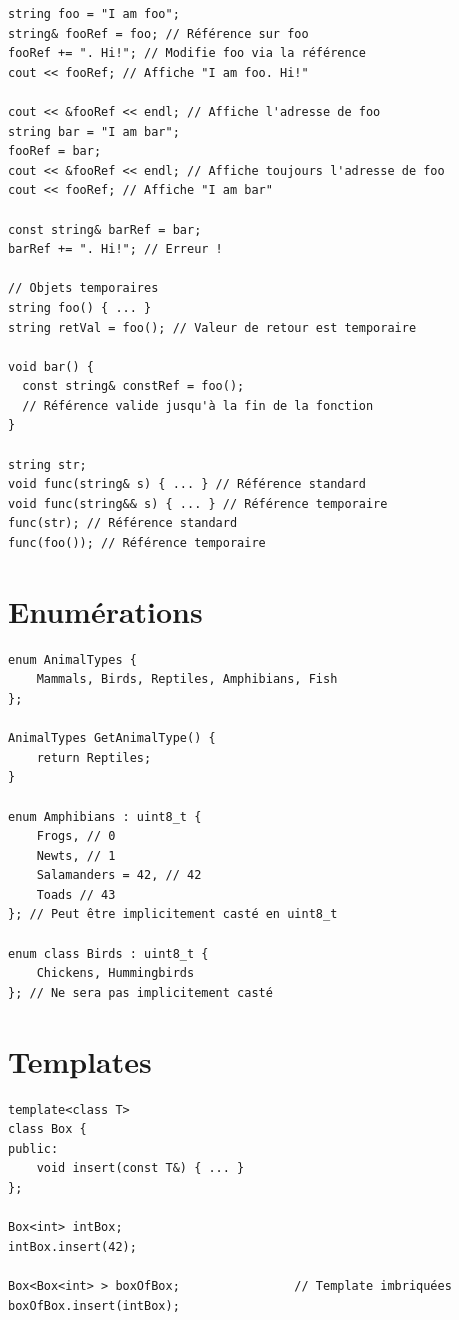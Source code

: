 \documentclass{article}
\begin{document}
\begin{multicols*}{3}
    \begin{lstlisting}
string foo = "I am foo";
string& fooRef = foo; // Référence sur foo
fooRef += ". Hi!"; // Modifie foo via la référence
cout << fooRef; // Affiche "I am foo. Hi!"

cout << &fooRef << endl; // Affiche l'adresse de foo
string bar = "I am bar";
fooRef = bar;
cout << &fooRef << endl; // Affiche toujours l'adresse de foo
cout << fooRef; // Affiche "I am bar"

const string& barRef = bar;
barRef += ". Hi!"; // Erreur !

// Objets temporaires
string foo() { ... }
string retVal = foo(); // Valeur de retour est temporaire

void bar() {
  const string& constRef = foo();
  // Référence valide jusqu'à la fin de la fonction
}

string str;
void func(string& s) { ... } // Référence standard
void func(string&& s) { ... } // Référence temporaire
func(str); // Référence standard
func(foo()); // Référence temporaire

\end{lstlisting}

    \section*{Enumérations}

    \begin{lstlisting}
enum AnimalTypes {
    Mammals, Birds, Reptiles, Amphibians, Fish
};

AnimalTypes GetAnimalType() {
    return Reptiles;
}

enum Amphibians : uint8_t {
    Frogs, // 0
    Newts, // 1
    Salamanders = 42, // 42
    Toads // 43
}; // Peut être implicitement casté en uint8_t

enum class Birds : uint8_t {
    Chickens, Hummingbirds
}; // Ne sera pas implicitement casté
\end{lstlisting}

    \section*{Templates}

    \begin{lstlisting}
template<class T>
class Box {
public:
    void insert(const T&) { ... }
};

Box<int> intBox;
intBox.insert(42);

Box<Box<int> > boxOfBox;                // Template imbriquées
boxOfBox.insert(intBox);


\end{lstlisting}
\end{multicols*}
\end{document}

